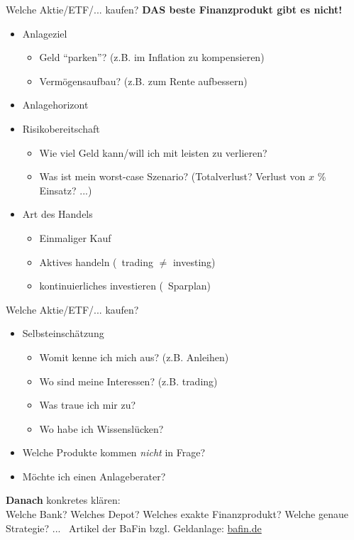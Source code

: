 \documentclass{beamer}
\begin{document}
			\begin{frame}{Welche Aktie/ETF/... kaufen?}
				\textbf{DAS beste Finanzprodukt gibt es nicht!}\pause
				\begin{itemize}
					\item Anlageziel
					\begin{itemize}
						\item Geld "`parken"'? (z.B. im Inflation zu kompensieren)
						\item Vermögensaufbau? (z.B. zum Rente aufbessern)
					\end{itemize}\pause
					\item Anlagehorizont\pause
					\item Risikobereitschaft
					\begin{itemize}
						\item Wie viel Geld kann/will ich mit leisten zu verlieren?
						\item Was ist mein worst-case Szenario? (Totalverlust? Verlust von $x$ \% Einsatz? ...)
					\end{itemize}\pause
					\item Art des Handels
					\begin{itemize}
						\item Einmaliger Kauf
						\item Aktives handeln (\textrightarrow\ trading $\neq$ investing)
						\item kontinuierliches investieren (\textrightarrow\ Sparplan)
					\end{itemize}
				\end{itemize}
			\end{frame}
		
			\begin{frame}{Welche Aktie/ETF/... kaufen?}
				\begin{itemize}
					\item Selbsteinschätzung
					\begin{itemize}
						\item Womit kenne ich mich aus? (z.B. Anleihen)
						\item Wo sind meine Interessen? (z.B. trading)
						\item Was traue ich mir zu?
						\item Wo habe ich Wissenslücken?
					\end{itemize}\pause
					\item Welche Produkte kommen \textit{nicht} in Frage? \pause
					\item Möchte ich einen Anlageberater? \pause
				\end{itemize}\n
				\textbf{Danach} konkretes klären:\\
				Welche Bank? Welches Depot? Welches exakte Finanzprodukt? Welche genaue Strategie? ...\n
				\textrightarrow\ Artikel der BaFin bzgl. Geldanlage: \href{https://www.bafin.de/SharedDocs/Veroeffentlichungen/DE/Fachartikel/2015/fa_bj_1506_geldanlage.html}{bafin.de}
			\end{frame}
	
\end{document}
